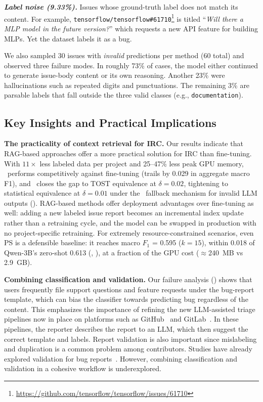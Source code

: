 \textbf{\textit{Label noise (9.33\%).}} Issues whose ground-truth label does not match its content. For example, \texttt{tensorflow/tensorflow\#61710}\footnote{\url{https://github.com/tensorflow/tensorflow/issues/61710}} is titled ``\textit{Will there a MLP model in the future version?}'' which requests a new API feature for building MLPs. Yet the dataset labels it as a bug.


We also sampled 30 issues with \textit{invalid} predictions per method (60 total) and observed three failure modes. In roughly 73\% of cases, the model either continued to generate issue-body content or its own reasoning. Another 23\% were hallucinations such as repeated digits and punctuations. The remaining 3\% are parsable labels that fall outside the three valid classes (e.g., \texttt{documentation}).


\subsection{Key Insights and Practical Implications}
\label{sec:disc-insights}

\textbf{The practicality of context retrieval for IRC.} Our results indicate that RAG-based approaches offer a more practical solution for IRC than fine-tuning. With $11\times$ less labeled data per project and 25--47\% less peak GPU memory, \ragtag\ performs competitively against fine-tuning (trails by 0.029 in aggregate macro F1), and \bragtag\ closes the gap to TOST equivalence at $\delta{=}0.02$, tightening to statistical equivalence at $\delta{=}0.01$ under the \votag\ fallback mechanism for invalid LLM outputs (). RAG-based methods offer deployment advantages over fine-tuning as well: adding a new labeled issue report becomes an incremental index update rather than a retraining cycle, and the model can be swapped in production with no project-specific retraining. For extremely resource-constrained scenarios, even \votag PS is a defensible baseline: it reaches macro $F_1$ = 0.595 ($k{=}15$), within 0.018 of Qwen-3B's zero-shot 0.613 (, ), at a fraction of the GPU cost ($\approx$240~MB vs 2.9~GB).

\textbf{Combining classification and validation.} Our failure analysis () shows that users frequently file support questions and feature requests under the bug-report template, which can bias the classifier towards predicting bug regardless of the content. This emphasizes the importance of refining the new LLM-assisted triage pipelines now in place on platforms such as GitHub~\cite{githubcopilot} and GitLab~\cite{gitlabduo}. In these pipelines, the reporter describes the report to an LLM, which then suggest the correct template and labels. Report validation is also important since mislabeling and duplication is a common problem among contributors\cite{antoniol2008bug, pandey2017automated}. Studies have already explored validation for bug reports~\cite{khatib2025assertflip, wang2024aegis, ahmed2025otter, dincc2025judge}. However, combining classification and validation in a cohesive workflow is underexplored.


